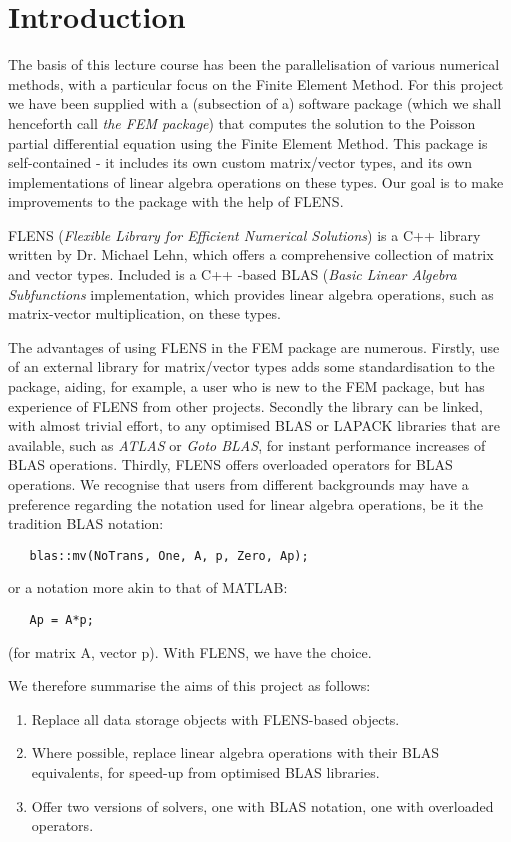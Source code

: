 \setcounter{section}{-1}
\section{Introduction}

The basis of this lecture course has been the parallelisation of various numerical methods, with a particular focus on the Finite Element Method. For this project we have been supplied with a (subsection of a) software package (which we shall henceforth call \emph{the FEM package}) that computes the solution to the Poisson partial differential equation using the Finite Element Method. This package is self-contained - it includes its own custom matrix/vector types, and its own implementations of linear algebra operations on these types. Our goal is to make improvements to the package with the help of FLENS.

FLENS (\emph{Flexible Library for Efficient Numerical Solutions}) is a C++ library written by Dr. Michael Lehn, which offers a comprehensive collection of matrix and vector types. Included is a C++ -based BLAS (\emph{Basic Linear Algebra Subfunctions} implementation, which provides linear algebra operations, such as matrix-vector multiplication, on these types. 

The advantages of using FLENS in the FEM package are numerous. Firstly, use of an external library for matrix/vector types adds some standardisation to the package, aiding, for example, a user who is new to the FEM package, but has experience of FLENS from other projects. Secondly the library can be linked, with almost trivial effort, to any optimised BLAS or LAPACK libraries that are available, such as \emph{ATLAS} or \emph{Goto BLAS}, for instant performance increases of BLAS operations. Thirdly, FLENS offers overloaded operators for BLAS operations. We recognise that users from different backgrounds may have a preference regarding the notation used for linear algebra operations, be it the tradition BLAS notation:
\begin{lstlisting}
   blas::mv(NoTrans, One, A, p, Zero, Ap);
\end{lstlisting}
or a notation more akin to that of MATLAB:
\begin{lstlisting}
   Ap = A*p;
\end{lstlisting}
(for matrix A, vector p). With FLENS, we have the choice.

We therefore summarise the aims of this project as follows:
\begin{enumerate}
   \item Replace all data storage objects with FLENS-based objects.
   \item Where possible, replace linear algebra operations with their BLAS equivalents, for speed-up from optimised BLAS libraries.
   \item Offer two versions of solvers, one with BLAS notation, one with overloaded operators.
\end{enumerate}

